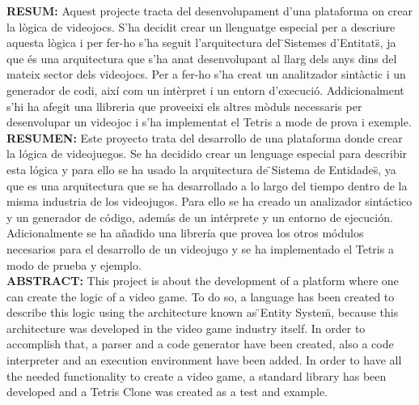 \documentclass{book}
\begin{document}
\pagestyle{empty}


\newpage

\newpage


\pagestyle{headings}
\setcounter{page}{1}

\begin{singlespace}
\setlength{\parskip}{0ex}
  \tableofcontents
  \listoffigures
  \listoftables
\setlength{\parskip}{1ex plus 0.5ex minus 0.2ex}
\end{singlespace}













\appendix
\newpage



\newpage
\pagestyle{empty}

{\bf RESUM:} Aquest projecte tracta del desenvolupament d'una plataforma on crear la lògica de videojocs. S'ha decidit crear un llenguatge especial per a descriure aquesta lògica i per fer-ho s'ha seguit l'arquitectura del \"{}Sistemes d'Entitats\"{}, ja que és una arquitectura que s'ha anat desenvolupant al llarg dels anys dins del mateix sector dels videojocs. Per a fer-ho s'ha creat un analitzador sintàctic i un generador de codi, així com un intèrpret i un entorn d'execució. Addicionalment s'hi ha afegit una llibreria que proveeixi els altres mòduls necessaris per desenvolupar un videojoc i s'ha implementat el Tetris a mode de prova i exemple.
\\

{\bf RESUMEN:} Este proyecto trata del desarrollo de una plataforma donde crear la lógica de videojuegos. Se ha decidido crear un lenguage especial para describir esta lógica y para ello se ha usado la arquitectura de \"{}Sistema de Entidades\"{}, ya que es una arquitectura que se ha desarrollado a lo largo del tiempo dentro de la misma industria de los videojugos. Para ello se ha creado un analizador sintáctico y un generador de código, además de un intérprete y un entorno de ejecución. Adicionalmente se ha añadido una librería que provea los otros módulos necesarios para el desarrollo de un videojugo y se ha implementado el Tetris a modo de prueba y ejemplo.
\\

{\bf ABSTRACT:} This project is about the development of a platform where one can create the logic of a video game. To do so, a language has been created to describe this logic using the architecture known as \"{}Entity System\"{}, because this architecture was developed in the video game industry itself. In order to accomplish that, a parser and a code generator have been created, also a code interpreter and an execution environment have been added. In order to have all the needed functionality to create a video game, a standard library has been developed and a Tetris Clone was created as a test and example.
\end{document}
